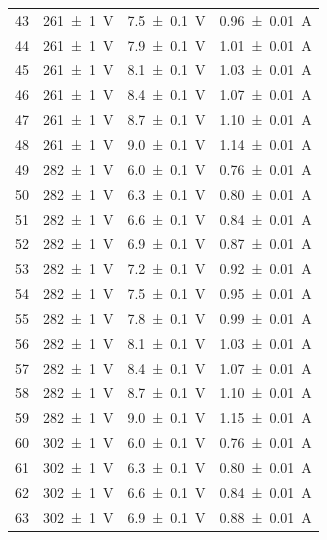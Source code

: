 \begin{table}[hb]
\begin{tabular}{|c|c|c|c|}
			43 & \SI{261 \pm 1}{\volt} &\SI{7.5 \pm 0.1}{\volt} & \SI{0.96 \pm 0.01}{\ampere}\\
			44 & \SI{261 \pm 1}{\volt} &\SI{7.9 \pm 0.1}{\volt} & \SI{1.01 \pm 0.01}{\ampere}\\
			45 & \SI{261 \pm 1}{\volt} &\SI{8.1 \pm 0.1}{\volt} & \SI{1.03 \pm 0.01}{\ampere}\\
			46 & \SI{261 \pm 1}{\volt} &\SI{8.4 \pm 0.1}{\volt} & \SI{1.07 \pm 0.01}{\ampere}\\
			47 & \SI{261 \pm 1}{\volt} &\SI{8.7 \pm 0.1}{\volt} & \SI{1.10 \pm 0.01}{\ampere}\\
			48 & \SI{261 \pm 1}{\volt} &\SI{9.0 \pm 0.1}{\volt} & \SI{1.14 \pm 0.01}{\ampere}\\
			49 & \SI{282 \pm 1}{\volt} &\SI{6.0 \pm 0.1}{\volt} & \SI{0.76 \pm 0.01}{\ampere}\\
			50 & \SI{282 \pm 1}{\volt} &\SI{6.3 \pm 0.1}{\volt} & \SI{0.80 \pm 0.01}{\ampere}\\
			51 & \SI{282 \pm 1}{\volt} &\SI{6.6 \pm 0.1}{\volt} & \SI{0.84 \pm 0.01}{\ampere}\\
			52 & \SI{282 \pm 1}{\volt} &\SI{6.9 \pm 0.1}{\volt} & \SI{0.87 \pm 0.01}{\ampere}\\
			53 & \SI{282 \pm 1}{\volt} &\SI{7.2 \pm 0.1}{\volt} & \SI{0.92 \pm 0.01}{\ampere}\\
			54 & \SI{282 \pm 1}{\volt} &\SI{7.5 \pm 0.1}{\volt} & \SI{0.95 \pm 0.01}{\ampere}\\
			55 & \SI{282 \pm 1}{\volt} &\SI{7.8 \pm 0.1}{\volt} & \SI{0.99 \pm 0.01}{\ampere}\\
			56 & \SI{282 \pm 1}{\volt} &\SI{8.1 \pm 0.1}{\volt} & \SI{1.03 \pm 0.01}{\ampere}\\
			57 & \SI{282 \pm 1}{\volt} &\SI{8.4 \pm 0.1}{\volt} & \SI{1.07 \pm 0.01}{\ampere}\\
			58 & \SI{282 \pm 1}{\volt} &\SI{8.7 \pm 0.1}{\volt} & \SI{1.10 \pm 0.01}{\ampere}\\
			59 & \SI{282 \pm 1}{\volt} &\SI{9.0 \pm 0.1}{\volt} & \SI{1.15 \pm 0.01}{\ampere}\\
			60 & \SI{302 \pm 1}{\volt} &\SI{6.0 \pm 0.1}{\volt} & \SI{0.76 \pm 0.01}{\ampere}\\
			61 & \SI{302 \pm 1}{\volt} &\SI{6.3 \pm 0.1}{\volt} & \SI{0.80 \pm 0.01}{\ampere}\\
			62 & \SI{302 \pm 1}{\volt} &\SI{6.6 \pm 0.1}{\volt} & \SI{0.84 \pm 0.01}{\ampere}\\
			63 & \SI{302 \pm 1}{\volt} &\SI{6.9 \pm 0.1}{\volt} & \SI{0.88 \pm 0.01}{\ampere}\\

\end{tabular}
\end{table}
